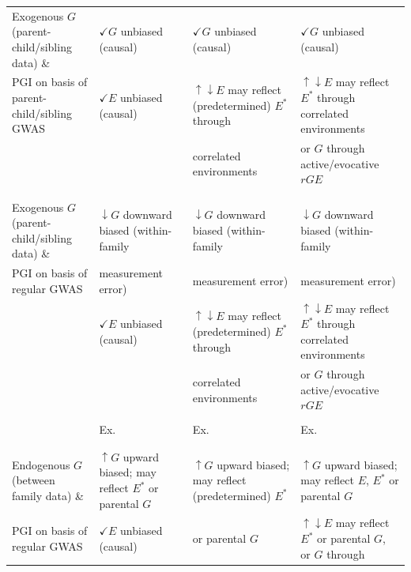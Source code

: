 \documentclass[12pt,a4paper]{article}
\begin{document}
\begin{bibunit}
\begin{landscape}
\begin{table}[H]
{\begin{tabular}{llll}
Exogenous $G$ (parent-child/sibling data) \&       & $\checkmark G$ unbiased (causal) & $\checkmark G$ unbiased (causal) & $\checkmark G$ unbiased (causal) \\
\indent\hspace{0.3cm} PGI on basis of parent-child/sibling GWAS       & $\checkmark E$ unbiased (causal)        & $\uparrow \downarrow E$ may reflect (predetermined) $E^*$ through & $\uparrow \downarrow E$ may reflect $E^*$ through correlated environments\\
 &   & \indent\hspace{0.3cm} correlated environments  & \indent\hspace{0.3cm} or $G$ through active/evocative $rGE$ \\
&&&\\
\hline
&&&\\

Exogenous $G$ (parent-child/sibling data) \&        & $\downarrow G$ downward biased (within-family  & $\downarrow G$ downward biased (within-family & $\downarrow G$ downward biased (within-family  \\
\indent\hspace{0.3cm} PGI on basis of regular GWAS  & \indent\hspace{0.3cm} measurement error) & \indent\hspace{0.3cm} measurement error) & \indent\hspace{0.3cm} measurement error) \\
  & $\checkmark E$ unbiased (causal) & $\uparrow \downarrow E$ may reflect (predetermined) $E^*$ through & $\uparrow \downarrow E$ may reflect $E^*$ through correlated environments\\
&  & \indent\hspace{0.3cm} correlated environments  & \indent\hspace{0.3cm} or $G$ through active/evocative $rGE$ \\
&&&\\
& Ex. \citet[][Birth order; UK Biobank]{Muslimova2020b} & Ex. \citet[][Family circumstances; iPSYCH]{houmark2022genetic} & Ex. \citet[][Social context; MoBa]{cheesman2022genes} \\
&&& \\
\hline
& & & \\

Endogenous $G$ (between family data) \& & $\uparrow G$ upward biased; may reflect $E^*$ or parental $G$  & $\uparrow G$ upward biased; may reflect (predetermined) $E^*$   & $\uparrow G$ upward biased; may reflect $E$, $E^*$ or parental $G$\\
\indent\hspace{0.3cm} PGI on basis of regular GWAS
  & $\checkmark E$ unbiased (causal) & \indent\hspace{0.3cm} or parental $G$ & $\uparrow \downarrow E$ may reflect $E^*$ or parental $G$, or $G$ through\\


\end{tabular}}
\end{table}
\end{landscape}
\end{bibunit}
\end{document}
